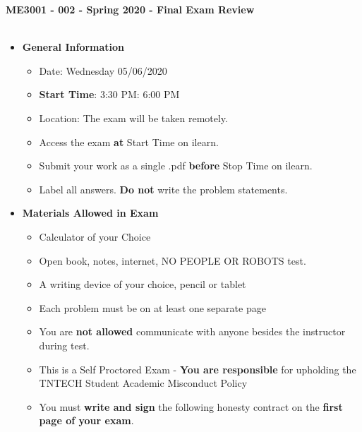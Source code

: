 \documentclass[11pt]{article}
\begin{document}

\textbf{ \LARGE ME3001 - 002 - Spring 2020 - Final Exam Review  } \\\\

\begin{itemize}
	\item  \textbf{\Large General Information}\\

	\begin{itemize}

		\item  {\Large Date: Wednesday 05/06/2020 }\\
		\item  {\Large {\bf Start Time}: 3:30 PM\hspace{5mm}{\bf Stop Time}: 6:00 PM}\\
		\item  {\Large Location: The exam will be taken remotely. }\\
		\item  {\Large Access the exam {\bf at} Start Time on ilearn.} \\
		\item {\Large Submit your work as a single .pdf {\bf before} Stop Time on ilearn.}\\ 
		\item  {\Large Label all answers. {\bf Do not} write the problem statements.}\\
	\end{itemize}

		\item  \textbf{\Large Materials Allowed in Exam}\\

	\begin{itemize}

		\item  {\Large Calculator of your Choice}
		\item  {\Large Open book, notes, internet, NO PEOPLE OR ROBOTS test.}\vspace{1mm}
		\item  {\Large A writing device of your choice, pencil or tablet}
		\item  {\Large Each problem must be on at least one separate page}
		
		\item  {\Large You are {\bf not allowed} communicate with anyone besides the instructor during test}. \\
		\item {\Large This is a Self Proctored Exam - {\bf You are responsible} for upholding the TNTECH Student Academic Misconduct Policy}\\
		\item  {\Large You must {\bf write and sign} the following honesty contract on the {\bf first page of your exam}}. \\


\end{itemize}
\end{itemize}
\end{document}

